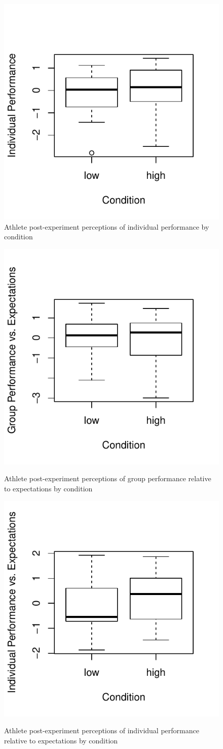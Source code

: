 \begin{figure}
  \centering
  \includegraphics[width=0.5\linewidth,keepaspectratio] {images/indComponentPerformancePostBoxPlot-1}
  \caption{Athlete post-experiment perceptions of individual performance by condition}
    \label{fig:indComponentPerformancePostBoxPlot}
\end{figure}

\begin{figure}
  \centering
  \includegraphics[width=0.5\linewidth,keepaspectratio] {images/groupPerfExpPostBoxPlot-1}
          \label{fig:groupPerfExpPostBoxPlot}
        \caption{Athlete post-experiment perceptions of group performance relative to expectations by condition}
\end{figure}


\begin{figure}
  \centering
      \includegraphics[width=0.5\linewidth,keepaspectratio] {images/indPerfExpPostBoxPlot-1}
              \label{fig:indPerfExpPostBoxPlot}
              \caption{Athlete post-experiment perceptions of individual performance relative to expectations by condition}
\end{figure}







